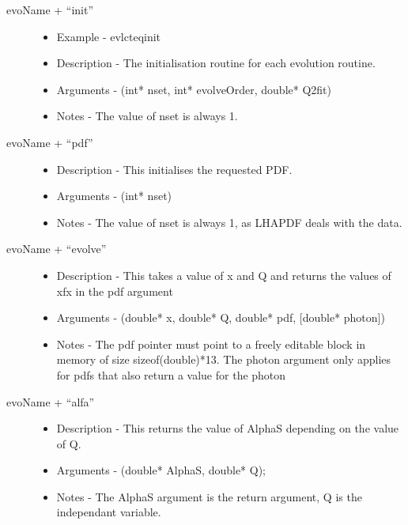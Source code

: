 \begin{description}
  \item[ evoName + ``init'' ] \hfill

    \begin{itemize}
      \item Example - evlcteqinit
      \item Description - The initialisation routine for each evolution 
            routine.
      \item Arguments - (int* nset, int* evolveOrder, double* Q2fit)
      \item Notes - The value of nset is always 1.
    \end{itemize}

 \item[  evoName + ``pdf'' ] \hfill

    \begin{itemize}
      \item Description - This initialises the requested PDF.
      \item Arguments - (int* nset)
      \item Notes - The value of nset is always 1, as LHAPDF deals with 
            the data.
    \end{itemize}
      
  \item[ evoName + ``evolve'' ] \hfill

    \begin{itemize}
      \item Description - This takes a value of x and Q and returns the 
            values of xfx in the pdf argument
      \item Arguments - (double* x, double* Q, double* pdf, 
            [double* photon])
      \item Notes - The pdf pointer must point to a freely editable block 
            in memory of size sizeof(double)*13. The photon argument only 
            applies for pdfs that also return a value for the photon
    \end{itemize}

  \item[ evoName + ``alfa'' ] \hfill

    \begin{itemize}
      \item Description - This returns the value of AlphaS depending on 
            the value of Q.
      \item Arguments - (double* AlphaS, double* Q);
      \item Notes - The AlphaS argument is the return argument, Q is the 
            independant variable.
    \end{itemize}

\end{description}

